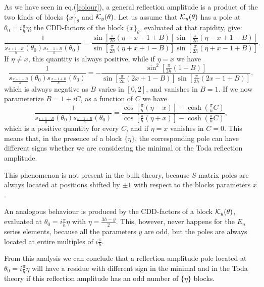 \documentclass[a4paper,12pt]{report}
\begin{document}
As we have seen in eq.(\ref{colour}), a general reflection amplitude is a product of the two kinds of blocks
$\{x\}_{\theta}$ and ${\cal K}_{y}(\theta)$. Let us assume that ${\cal K}_{y}(\theta)$ has a pole at
$\theta_{0}=i\frac{\pi}{h}\eta$; the CDD-factors of the block $\{x\}_{\theta}$, evaluated at that rapidity, give:
\begin{equation}
\frac{1}{s_{\frac{x+1-B}{h}}(\theta_{0})s_{\frac{x-1+B}{h}}(\theta_{0})}=\frac{\sin\left[\frac{\pi}{2h}(\eta-x-1+B)\right]\sin\left[\frac{\pi}{2h}(\eta-x+1-B)\right]}{\sin\left[\frac{\pi}{2h}(\eta+x+1-B)\right]\sin\left[\frac{\pi}{2h}(\eta+x-1+B)\right]}.
\end{equation}
If $\eta\neq x$, this quantity is always positive, while if $\eta=x$ we have
\begin{equation}\label{neg}
\frac{1}{s_{\frac{x+1-B}{h}}(\theta_{0})s_{\frac{x-1+B}{h}}(\theta_{0})}=-\frac{\sin^{2}\left[\frac{\pi}{2h}(1-B)\right]}{\sin\left[\frac{\pi}{2h}(2x+1-B)\right]\sin\left[\frac{\pi}{2h}(2x-1+B)\right]},
\end{equation}
which is always negative as $B$ varies in $[0,2]$, and vanishes in $B=1$. If we now parameterize $B=1+iC$, as a
function of $C$ we have
\begin{equation}\label{neg}
\frac{1}{s_{\frac{x+1-B}{h}}(\theta_{0})s_{\frac{x-1+B}{h}}(\theta_{0})}=\frac{\cos\left[\frac{\pi}{h}(\eta-x)\right]-\cosh\left(\frac{\pi}{h}C\right)}{\cos\left[\frac{\pi}{h}(\eta+x)\right]-\cosh\left(\frac{\pi}{h}C\right)},
\end{equation}
which is a positive quantity for every $C$, and if $\eta=x$ vanishes in $C=0$. This means that, in the presence of
a block $\{\eta\}$, the corresponding pole can have different signs whether we are considering the minimal or the
Toda reflection amplitude.

This phenomenon is not present in the bulk theory, because $S$-matrix poles are always located at positions
shifted by $\pm 1$ with respect to the blocks parameters $x$.

An analogous behaviour is produced by the CDD-factors of a block ${\cal K}_{y}(\theta)$, evaluated at
$\theta_{0}=i\frac{\pi}{h}\eta$ with $\eta=\frac{3h-y}{2}$. This, however, never happens for the $E_{n}$ series
elements, because all the parameters $y$ are odd, but the poles are always located at entire multiples of
$i\frac{\pi}{h}$.

From this analysis we can conclude that a reflection amplitude pole located at $\theta_{0}=i\frac{\pi}{h}\eta$
will have a residue with different sign in the minimal and in the Toda theory if this reflection amplitude has an
odd number of $\{\eta\}$ blocks.
\end{document}
